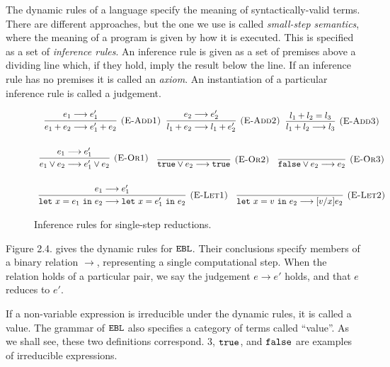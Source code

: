 The dynamic rules of a language specify the meaning of syntactically-valid terms. There are different approaches, but the one we use is called \textit{small-step semantics}, where the meaning of a program is given by how it is executed. This is specified as a set of \textit{inference rules}. An inference rule is given as a set of premises above a dividing line which, if they hold, imply the result below the line. If an inference rule has no premises it is called an \textit{axiom}. An instantiation of a particular inference rule is called a judgement.

\begin{figure}[h]

\noindent
{}

\[
\begin{array}{c}

\infer[\textsc{(E-Add1)}]
	{e_1 + e_2 \longrightarrow e_1' + e_2}
	{e_1 \longrightarrow e_1'}
~~
\infer[\textsc{(E-Add2)}]
	{l_1 + e_2 \longrightarrow l_1 + e_2'}
	{e_2 \longrightarrow e_2'}
~~
\infer[\textsc{(E-Add3)}]
	{l_1 + l_2 \longrightarrow l_3}
	{l_1 + l_2 = l_3} \\[4ex]

\infer[\textsc{(E-Or1)}]
	{e_1 \lor e_2 \longrightarrow e_1' \lor e_2}
	{e_1 \longrightarrow e_1'}
	~~~
\infer[\textsc{(E-Or2)}]
	{\true \lor e_2 \longrightarrow \true}
	{}
	~~~
\infer[\textsc{(E-Or3)}]
	{\false \lor e_2 \longrightarrow e_2}
	{}\\[4ex]
	
\infer[\textsc{(E-Let1)}]
	{\letxpr{x}{e_1}{e_2} \longrightarrow \letxpr{x}{e_1'}{e_2}}
	{e_1 \longrightarrow e_1'}
	~~~
\infer[\textsc{(E-Let2)}]
	{\letxpr{x}{v}{e_2} \longrightarrow [v/x]e_2}
	{}

\end{array}
\]


\vspace{-12pt}
\caption{Inference rules for single-step reductions.}
\label{A sample. }
\end{figure}

Figure 2.4. gives the dynamic rules for $\mathtt{EBL}$. Their conclusions specify members of a binary relation $\longrightarrow$, representing a single computational step. When the relation holds of a particular pair, we say the judgement $e \longrightarrow e'$ holds, and that $e$ reduces to $e'$. 

If a non-variable expression is irreducible under the dynamic rules, it is called a value. The grammar of $\mathtt{EBL}$ also specifies a category of terms called ``value''. As we shall see, these two definitions correspond. $3$, $\mathtt{true}$, and $\mathtt{false}$ are examples of irreducible expressions.

